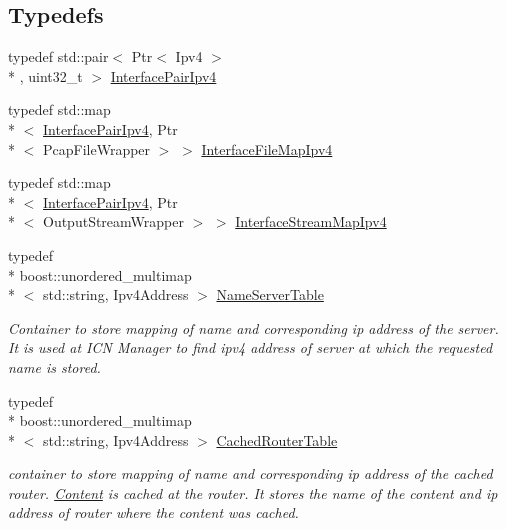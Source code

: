 \subsection*{Typedefs}
\begin{DoxyCompactItemize}
\item 
typedef std\-::pair$<$ Ptr$<$ Ipv4 $>$\\*
, uint32\-\_\-t $>$ \hyperlink{namespacens3_a83e2603870381affabd5ca766d17daff}{Interface\-Pair\-Ipv4}
\item 
typedef std\-::map\\*
$<$ \hyperlink{namespacens3_a83e2603870381affabd5ca766d17daff}{Interface\-Pair\-Ipv4}, Ptr\\*
$<$ Pcap\-File\-Wrapper $>$ $>$ \hyperlink{namespacens3_ab14a5629528234e6f76ad3bb180022fe}{Interface\-File\-Map\-Ipv4}
\item 
typedef std\-::map\\*
$<$ \hyperlink{namespacens3_a83e2603870381affabd5ca766d17daff}{Interface\-Pair\-Ipv4}, Ptr\\*
$<$ Output\-Stream\-Wrapper $>$ $>$ \hyperlink{namespacens3_a5634ac4e27d952132fba4cd906d4ebd3}{Interface\-Stream\-Map\-Ipv4}
\item 
typedef \\*
boost\-::unordered\-\_\-multimap\\*
$<$ std\-::string, Ipv4\-Address $>$ \hyperlink{namespacens3_a30b2bc59285e3015fedd6268c6f77947}{Name\-Server\-Table}
\begin{DoxyCompactList}\small\item\em Container to store mapping of name and corresponding ip address of the server. It is used at I\-C\-N Manager to find ipv4 address of server at which the requested name is stored. \end{DoxyCompactList}\item 
typedef \\*
boost\-::unordered\-\_\-multimap\\*
$<$ std\-::string, Ipv4\-Address $>$ \hyperlink{namespacens3_a6e64320f2e97002ba6cd340bbfb76767}{Cached\-Router\-Table}
\begin{DoxyCompactList}\small\item\em container to store mapping of name and corresponding ip address of the cached router. \hyperlink{classns3_1_1Content}{Content} is cached at the router. It stores the name of the content and ip address of router where the content was cached. \end{DoxyCompactList}\item 

\end{DoxyCompactItemize}
